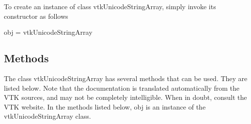 To create an instance of class vtk\-Unicode\-String\-Array, simply invoke its constructor as follows \begin{DoxyVerb}  obj = vtkUnicodeStringArray
\end{DoxyVerb}
 \hypertarget{vtkwidgets_vtkxyplotwidget_Methods}{}\subsection{Methods}\label{vtkwidgets_vtkxyplotwidget_Methods}
The class vtk\-Unicode\-String\-Array has several methods that can be used. They are listed below. Note that the documentation is translated automatically from the V\-T\-K sources, and may not be completely intelligible. When in doubt, consult the V\-T\-K website. In the methods listed below, {\ttfamily obj} is an instance of the vtk\-Unicode\-String\-Array class. 
